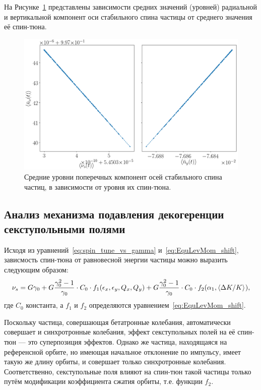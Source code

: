 На Рисунке~\ref{decoh:fig:nbar_vs_ST} представлены зависимости средних значений (уровней) радиальной и вертикальной компонент оси стабильного спина частицы от среднего значения её спин-тюна. 
\begin{figure}[!h]
	\centering
	\includegraphics[width=\linewidth]{images/decoh_sim/mean_n_bar_vs_spin_tune}
	\caption{Средние уровни поперечных компонент осей стабильного спина частиц, в зависимости от уровня их спин-тюна.\label{decoh:fig:nbar_vs_ST}}
\end{figure}

\subsection{Анализ механизма подавления декогеренции секступольными полями}
Исходя из уравнений~\eqref{eq:spin_tune_vs_gamma} и~\eqref{eq:EquLevMom_shift}, зависмость спин-тюна от равновесной энергии частицы можно выразить следующим образом:
\[
\nu_s = G\gamma_0 + G\frac{\gamma_0^2-1}{\gamma_0}\cdot C_0\cdot f_1(\epsilon_x, \epsilon_y, Q_x, Q_y)+ G\frac{\gamma_0^2-1}{\gamma_0}\cdot C_0\cdot f_2(\alpha_1, \avg{\Delta K/K}),
\]
где $C_0$ константа, а $f_1$ и $f_2$ определяются уравнением~\eqref{eq:EquLevMom_shift}.

Поскольку частица, совершающая бетатронные колебания, автоматически совершает и синхротронные колебания, эффект секступольных полей на её спин-тюн --- это суперпозиция эффектов. Однако же частица, находящаяся на референсной орбите, но имеющая начальное отклонение по импульсу, имеет такую же длину орбиты, и совершает только синхротронные колебания. Соответственно, секступольные поля влияют на спин-тюн такой частицы только путём модификации коэффициента сжатия орбиты, т.е. функции $f_2$. 

